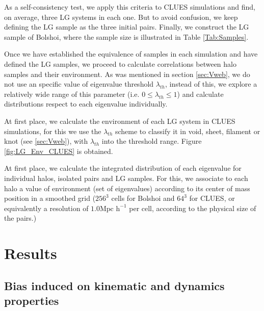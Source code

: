 \documentclass[usenatbib]{latex/mn2e}
\begin{document}
As a self-consistency test, we apply this criteria to CLUES simulations 
and find, on average, three LG systems in each one. But to avoid confusion, 
we keep defining the LG sample as the three initial pairs. Finally, we 
construct the LG sample of Bolshoi, where the sample size is illustrated 
in Table \ref{Tab:Samples}.



Once we have established the equivalence of samples in each simulation and 
have defined the LG samples, we proceed to calculate correlations between 
halo samples and their environment. As was mentioned in section 
\ref{sec:Vweb}, we do not use an specific value of eigenvalue threshold 
$\lambda_{th}$, instead of this, we explore a relatively wide range of 
this parameter (i.e. $0 \leq \lambda_{th} \leq 1$) and calculate 
distributions respect to each eigenvalue individually.



At first place, we calculate the environment of each LG system in CLUES 
simulations, for this we use the $\lambda_{th}$ scheme to classify it in 
void, sheet, filament or knot (see \ref{sec:Vweb}), with $\lambda_{th}$
into the threshold range. Figure \ref{fig:LG_Env_CLUES} is obtained.



At first place, we calculate the integrated distribution of each 
eigenvalue for individual halos, isolated pairs and LG samples. For this, 
we associate to each halo a value of environment (set of eigenvalues)
according to its center of mass position in a smoothed grid ($256^3$ 
cells for Bolshoi and $64^3$ for CLUES, or equivalently a resolution of 
$1.0 \mbox{Mpc h}^{-1} $ per cell, according to the physical size of the 
pairs.)



\section{Results}
\label{sec:Results}

\subsection{Bias induced on kinematic and dynamics properties}
\label{subsec:bias_kinematic}
\end{document}
